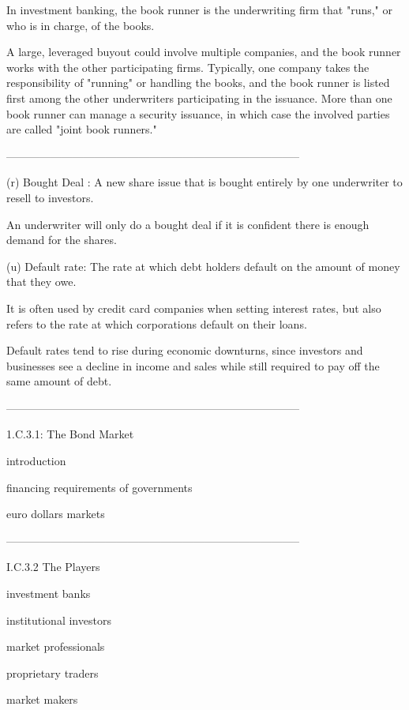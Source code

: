 In investment banking, the book runner is the underwriting firm that "runs," or who is in charge, of the books. 


A large, leveraged buyout could involve multiple companies, and the book runner works with the other participating firms. Typically, one company takes the responsibility of "running" or handling the books, and the book runner is listed first among the other underwriters participating in the issuance. More than one book runner can manage a security issuance, in which case the involved parties are called "joint book runners."




--------------------------------------------------------------------------------


(r) Bought Deal : A new share issue that is bought entirely by one underwriter to resell to investors.


An underwriter will only do a bought deal if it is confident there is enough demand for the shares.



(u) Default rate: The rate at which debt holders default on the amount of money that they owe. 

It is often used by credit card companies when setting interest rates, but also refers to the rate at which corporations default on their loans. 

Default rates tend to rise during economic downturns, since investors and businesses see a decline in income and sales while still required to pay off the same amount of debt.




--------------------------------------------------------------------------------



1.C.3.1: The Bond Market

introduction

financing requirements of governments

euro dollars markets


--------------------------------------------------------------------------------


I.C.3.2 The Players

investment banks

institutional investors

market professionals

proprietary traders

market makers


